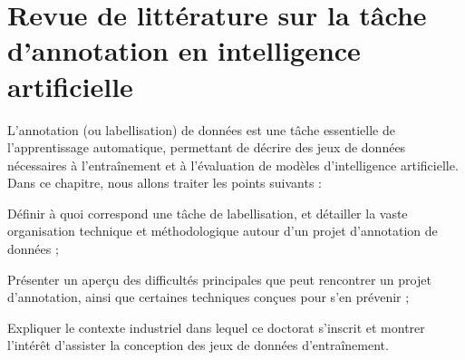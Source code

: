 \chapter{Revue de littérature sur la tâche d'annotation en intelligence artificielle}
\label{chapter:2-REVUE-DE-LITTERATURE}
	
	L'annotation (ou labellisation) de données est une tâche essentielle de l'apprentissage automatique, permettant de décrire des jeux de données nécessaires à l'entraînement et à l'évaluation de modèles d'intelligence artificielle.
	Dans ce chapitre, nous allons traiter les points suivants :
	\begin{leftBarImportantRed}
		\begin{todolist}
			\item Définir à quoi correspond une tâche de labellisation, et détailler la vaste organisation technique et méthodologique autour d'un projet d'annotation de données ;
			\item Présenter un aperçu des difficultés principales que peut rencontrer un projet d'annotation, ainsi que certaines techniques conçues pour s'en prévenir ;
			\item Expliquer le contexte industriel dans lequel ce doctorat s'inscrit et montrer l'intérêt d'assister la conception des jeux de données d'entraînement.
		\end{todolist}
	\end{leftBarImportantRed}
	
	\minitoc
	
	
	
	
	
	
	
	
	
	
	